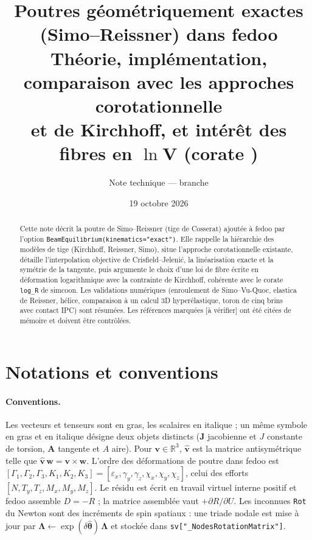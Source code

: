 \documentclass[11pt,a4paper]{article}
\title{Poutres géométriquement exactes (Simo--Reissner) dans fedoo\\[0.3em]
\large Théorie, implémentation, comparaison avec les approches corotationnelle\\
et de Kirchhoff, et intérêt des fibres en $\ln\mathbf V$ (corate \code{log\_R})}
\author{Note technique --- branche \code{feature/beam-simo-reissner}}
\date{19 octobre 2026}
\newcommand{\hatv}[1]{\widehat{\bm{#1}}}
\newcommand{\Lam}{\bm{\Lambda}}
\newcommand{\code}[1]{\texttt{#1}}
\newcommand{\averif}{\textcolor{orange!80!black}{[à vérifier]}}
\begin{document}
\maketitle

\begin{abstract}
Cette note décrit la poutre de Simo--Reissner (tige de Cosserat) ajoutée à fedoo
par l'option \code{BeamEquilibrium(kinematics="exact")}. Elle rappelle la
hiérarchie des modèles de tige (Kirchhoff, Reissner, Simo), situe l'approche
corotationnelle existante, détaille l'interpolation objective de
Crisfield--Jelenić, la linéarisation exacte et la symétrie de la tangente, puis
argumente le choix d'une loi de fibre écrite en déformation logarithmique avec la
contrainte de Kirchhoff, cohérente avec le corate \code{log\_R} de simcoon. Les
validations numériques (enroulement de Simo--Vu-Quoc, elastica de Reissner,
hélice, comparaison à un calcul 3D hyperélastique, toron de cinq brins avec
contact IPC) sont résumées. Les références marquées \averif{} ont été citées de
mémoire et doivent être contrôlées.
\end{abstract}

\tableofcontents

\section{Notations et conventions}

\paragraph{Conventions.} Les vecteurs et tenseurs sont en gras, les scalaires en
italique ; un même symbole en gras et en italique désigne deux objets distincts
($\mathbf J$ jacobienne et $J$ constante de torsion, $\mathbf A$ tangente et $A$
aire). Pour $\mathbf v\in\mathbb R^3$, $\hatv v$ est la matrice antisymétrique
telle que $\hatv v\,\mathbf w=\mathbf v\times\mathbf w$. L'ordre des
déformations de poutre dans fedoo est
$[\Gamma_1,\Gamma_2,\Gamma_3,K_1,K_2,K_3]=[\varepsilon_x,\gamma_y,\gamma_z,\chi_x,\chi_y,\chi_z]$,
celui des efforts $[N,T_y,T_z,M_x,M_y,M_z]$. Le résidu est écrit en travail
virtuel interne positif et fedoo assemble $D=-R$ ; la matrice assemblée vaut
$+\partial R/\partial U$. Les inconnues \code{Rot} du Newton sont des
incréments de spin spatiaux : une triade nodale est mise à jour par
$\Lam\leftarrow\exp(\delta\hatv{\theta})\,\Lam$ et stockée dans
\code{sv["\_NodesRotationMatrix"]}.
\end{document}
